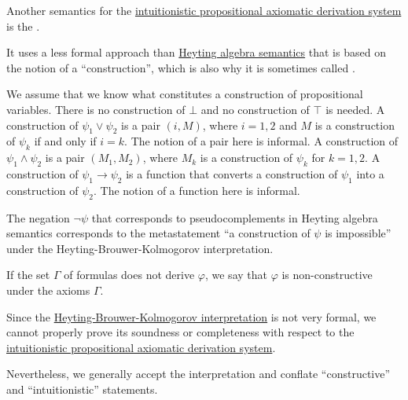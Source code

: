 \begin{definition}\label{def:brouwer_heyting_kolmogorov_interpretation}
  Another semantics for the \hyperref[def:intuitionistic_propositional_axiomatic_derivation_system]{intuitionistic propositional axiomatic derivation system} is the .

  It uses a less formal approach than \hyperref[def:heyting_algebra_semantics]{Heyting algebra semantics} that is based on the notion of a \enquote{construction}, which is also why it is sometimes called .

  \begin{thmenum}
     We assume that we know what constitutes a construction of propositional variables.
     There is no construction of \( \bot \) and no construction of \( \top \) is needed.
     A construction of \( \psi_1 \vee \psi_2 \) is a pair \( (i, M) \), where \( i = 1, 2 \) and \( M \) is a construction of \( \psi_k \) if and only if \( i = k \). The notion of a pair here is informal.
     A construction of \( \psi_1 \wedge \psi_2 \) is a pair \( (M_1, M_2) \), where \( M_k \) is a construction of \( \psi_k \) for \( k = 1, 2 \).
     A construction of \( \psi_1 \rightarrow \psi_2 \) is a function that converts a construction of \( \psi_1 \) into a construction of \( \psi_2 \). The notion of a function here is informal.
  \end{thmenum}

  The negation \( \neg\psi \) that corresponds to pseudocomplements in Heyting algebra semantics corresponds to the metastatement \enquote{a construction of \( \psi \) is impossible} under the Heyting-Brouwer-Kolmogorov interpretation.

  If the set \( \Gamma \) of formulas does not derive \( \varphi \), we say that \( \varphi \) is non-constructive under the axioms \( \Gamma \).
\end{definition}

\begin{remark}\label{rem:brouwer_heyting_kolmogorov_interpretation_compatibility}
  Since the \hyperref[def:heyting_brouwer_kolmogorov_interpretation]{Heyting-Brouwer-Kolmogorov interpretation} is not very formal, we cannot properly prove its soundness or completeness with respect to the \hyperref[def:intuitionistic_propositional_axiomatic_derivation_system]{intuitionistic propositional axiomatic derivation system}.

  Nevertheless, we generally accept the interpretation and conflate \enquote{constructive} and \enquote{intuitionistic} statements.
\end{remark}

